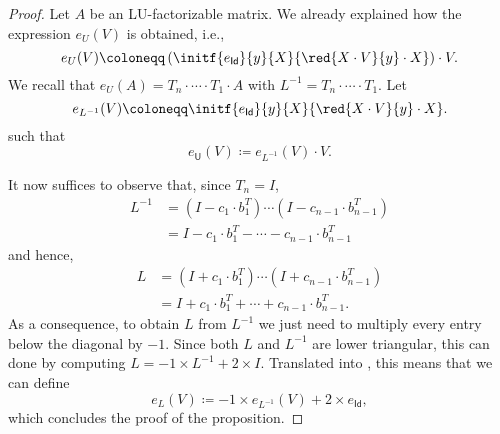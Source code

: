 \begin{proof}
    Let $A$ be an LU-factorizable matrix. We already explained how the expression 
    $e_U(V)$ is obtained, i.e., 
    $$
    e_{U}(V) \coloneqq   \left( \initf{e_{\mathsf{Id}}}{y}{X}{\red{X\cdot V}{y}\cdot X} \right) \cdot V.
    $$
    We recall that $e_U(A)=T_n\cdot\cdots\cdot T_1\cdot A$ with $L^{-1}=T_n\cdot\cdots\cdot T_1$. Let
    $$
    e_{L^{-1}}(V) \coloneqq   \initf{e_{\mathsf{Id}}}{y}{X}{\red{X\cdot V}{y}\cdot X}.
    $$
    such that	$$
        e_{\mathsf{U}}(V) \coloneqq   e_{L^{-1}}(V) \cdot V.
        $$

    It now suffices to observe that, since $T_n=I$,
    \begin{align*}
    L^{-1}&=(I-c_1\cdot b_1^T)\cdots (I-c_{n-1}\cdot  b_{n-1}^T) \\
    &=I-c_1\cdot b_1^T-\cdots - c_{n-1}\cdot b_{n-1}^T
    \end{align*}
    and hence,
    \begin{align*}
    L&=(I+c_1\cdot b_1^T)\cdots (I+c_{n-1}\cdot b_{n-1}^T) \\
    &=I+c_1\cdot b_1^T+\cdots + c_{n-1}\cdot b_{n-1}^T.
    \end{align*}
    As a consequence, to obtain $L$ from $L^{-1}$ we just need to multiply every entry below the diagonal by $-1$. Since both  $L$ and $L^{-1}$ are lower triangular, this can done 
    by computing $L=-1\times L^{-1} + 2\times I$. Translated into \langfor, this means that we can define
    $$
    e_{L}(V) \coloneqq   -1\times e_{L^{-1}}(V) + 2\times e_{\mathsf{Id}},
    $$
    which concludes the proof of the proposition.
\end{proof}
